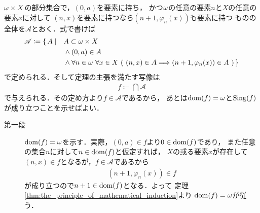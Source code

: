 	\begin{prf}
		${\bf \omega} \times X$の部分集合で，$(0,a)$を要素に持ち，
		かつ${\bf \omega}$の任意の要素$n$と$X$の任意の要素$x$に対して
		$(n,x)$を要素に持つなら$(n+1,\varphi_n(x))$も要素に持つ
		ものの全体を$\mathscr{A}$とおく．式で書けば
		\begin{align}
			\mathscr{A} \coloneqq
			\{\, A \mid \quad &A \subset \omg \times X \\
			&\wedge (0,a) \in A \\
			&\wedge \forall n \in \omg\ \forall x \in X
			\ (\ (n,x) \in A \Longrightarrow (n+1,\varphi_n(x)) \in A\ )\, \}
		\end{align}
		で定められる．そして定理の主張を満たす写像は
		\begin{align}
			f \coloneqq \bigcap \mathscr{A}
		\end{align}
		で与えられる．その定め方より$f \in \mathscr{A}$であるから，
		あとは$\operatorname*{dom}(f) = {\bf \omega}$と$\operatorname*{Sing}(f)$が成り立つことを示せばよい．
		\begin{description}
			\item[第一段]
				$\operatorname*{dom}(f) = {\bf \omega}$を示す．実際，$(0,a) \in f$より$0 \in \operatorname*{dom}(f)$であり，
				また任意の集合$n$に対して$n \in \operatorname*{dom}(f)$と仮定すれば，
				$X$の或る要素$x$が存在して$(n,x) \in f$となるが，$f \in \mathscr{A}$であるから
				\begin{align}
					(n+1,\varphi_n(x)) \in f
				\end{align}
				が成り立つので$n+1 \in \operatorname*{dom}(f)$となる．よって
				定理\ref{thm:the_principle_of_mathematical_induction}より
				$\operatorname*{dom}(f) = {\bf \omega}$が従う．
				

\end{description}
\end{prf}
